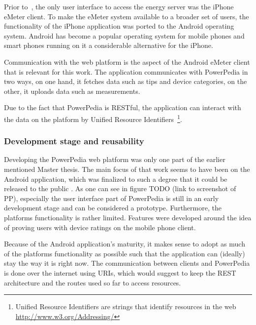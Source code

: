 Prior to~\cite{merklepp}, the only user interface to access the energy server was the iPhone eMeter client. To make the eMeter system available to a broader set of users, the functionality of the iPhone application was ported to the Android operating system. Android has become a popular operating system for mobile phones and smart phones running on it a considerable alternative for the iPhone.

Communication with the web platform is the aspect of the Android eMeter client that is relevant for this work. The application communicates with PowerPedia in two ways, on one hand, it fetches data such as tips and device categories, on the other, it uploads data such as measurements.  

Due to the fact that PowerPedia is RESTful, the application can interact with the data on the platform by Unified Resource Identifiers~\footnote{Unified Resource Identifiers are strings that identify resources in the web \url{http://www.w3.org/Addressing/}}.  


\subsubsection{Development stage and reusability}

Developing the PowerPedia web platform was only one part of the earlier mentioned Master thesis. The main focus of that work seems to have been on the Android application, which was finalized to such a degree that it could be released to the public . As one can see in figure TODO (link to screenshot of PP), especially the user interface part of PowerPedia is still in an early development stage and can be considered a prototype. Furthermore, the platforms functionality is rather limited. Features were developed around the idea of proving users with device ratings on the mobile phone client.

Because of the Android application's maturity, it makes sense to adopt as much of the platforms functionality as possible such that the application can (ideally) stay the way it is right now. The communication between clients and PowerPedia is done over the internet using URIs, which would suggest to keep the REST architecture and the routes used so far to access resources.

